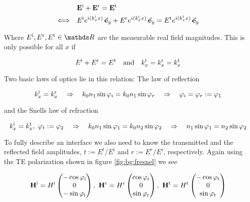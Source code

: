 \begin{equation}
\begin{aligned}
    &\vb E^{\mathrm{i}} + \vb E^{\mathrm{r}} = \vb E^{\mathrm{t}} \\
    \Longleftrightarrow \quad
    &E^{\mathrm{i}} e^{i(k^{\mathrm{i}}_x x)} \, \va e_y +
    E^{\mathrm{r}} e^{i(k^{\mathrm{r}}_x x)} \, \va e_y = 
    E^{\mathrm{t}} e^{i(k^{\mathrm{t}}_x x)} \, \va e_y
\end{aligned}
\end{equation}

Where $E^\s i, E^\s r, E^\s t \in \mathds R$ are the measurable real field magnitudes. This is only possible for all $x$ if

\begin{equation} \label{eq:bg:x}
    E^\s{i} + E^\s{r} = E^\s{t} \qq{and}
    k^\s{i}_x = k^\s{r}_x = k^\s{t}_x
\end{equation}

Two basic laws of optics lie in this relation: The law of reflection

\begin{equation}
    k^{\mathrm{i}}_x = k^{\mathrm{r}}_x
    \quad \Rightarrow \quad
    k_0 n_1 \sin \varphi_i =  k_0 n_1 \sin \varphi_r
    \quad \Rightarrow \quad
    \varphi_i = \varphi_r := \varphi_1
\end{equation}

and the Snells law of refraction

\begin{equation}
    k^{\mathrm{i}}_x = k^{\mathrm{t}}_x, \
    \varphi_t := \varphi_2
    \quad \Rightarrow \quad
    k_0 n_1 \sin \varphi_1 =  k_0 n_2 \sin \varphi_2
    \quad \Rightarrow \quad
    n_1 \sin \varphi_1 = n_2 \sin \varphi_2
\end{equation}

To fully describe an interface we also need to know the transmitted and the reflected field amplitudes,  
$t := E^t / E^i$ 
and 
$r := E^r / E^i$, 
respectively.
Again using the TE polarization shown in figure \ref{fig:bg:fresnel} we see

\begin{equation} \label{eq:bg:H}
    \vb H^{\mathrm{i}} = H^{\mathrm{i}}
    \begin{pmatrix}
        -\cos \varphi_{\mathrm{i}}\\ 0\\ -\sin \varphi_{\mathrm{i}}
    \end{pmatrix}
    , \
    \vb H^{\mathrm{r}} = H^{\mathrm{r}}
    \begin{pmatrix}
        \cos \varphi_{\mathrm{r}} \\ 0\\ \sin \varphi_{\mathrm{r}}
    \end{pmatrix}
    , \
    \vb H^{\mathrm{t}} = H^{\mathrm{t}}
    \begin{pmatrix}
        -\cos \varphi_{\mathrm{t}}\\ 0\\ \sin \varphi_{\mathrm{t}}
    \end{pmatrix}
\end{equation}
\\
\\
\\

